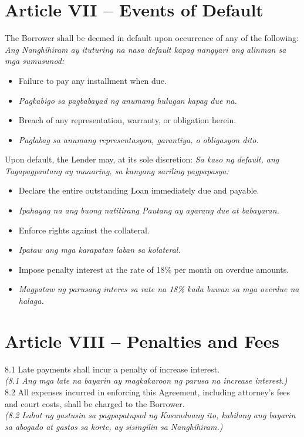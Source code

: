\documentclass[a4paper,12pt]{article}
\begin{document}
\section*{Article VII – Events of Default}
The Borrower shall be deemed in default upon occurrence of any of the following:
\textit{Ang Nanghihiram ay ituturing na nasa default kapag nangyari ang alinman sa mga sumusunod:}
\begin{itemize}
\item Failure to pay any installment when due.
\item \textit{Pagkabigo sa pagbabayad ng anumang hulugan kapag due na.}
\item Breach of any representation, warranty, or obligation herein.
\item \textit{Paglabag sa anumang representasyon, garantiya, o obligasyon dito.}
\end{itemize}
Upon default, the Lender may, at its sole discretion:
\textit{Sa kaso ng default, ang Tagapagpautang ay maaaring, sa kanyang sariling pagpapasya:}
\begin{itemize}
\item Declare the entire outstanding Loan immediately due and payable.
\item \textit{Ipahayag na ang buong natitirang Pautang ay agarang due at babayaran.}
\item Enforce rights against the collateral.
\item \textit{Ipataw ang mga karapatan laban sa kolateral.}
\item Impose penalty interest at the rate of 18\% per month on overdue amounts.
\item \textit{Magpataw ng parusang interes sa rate na 18\% kada buwan sa mga overdue na halaga.}
\end{itemize}
\section*{Article VIII – Penalties and Fees}
8.1 Late payments shall incur a penalty of increase interest. \\
\textit{(8.1 Ang mga late na bayarin ay magkakaroon ng parusa na increase interest.)}
8.2 All expenses incurred in enforcing this Agreement, including attorney's fees and court costs, shall be charged to the Borrower. \\
\textit{(8.2 Lahat ng gastusin sa pagpapatupad ng Kasunduang ito, kabilang ang bayarin sa abogado at gastos sa korte, ay sisingilin sa Nanghihiram.)}
\end{document}

